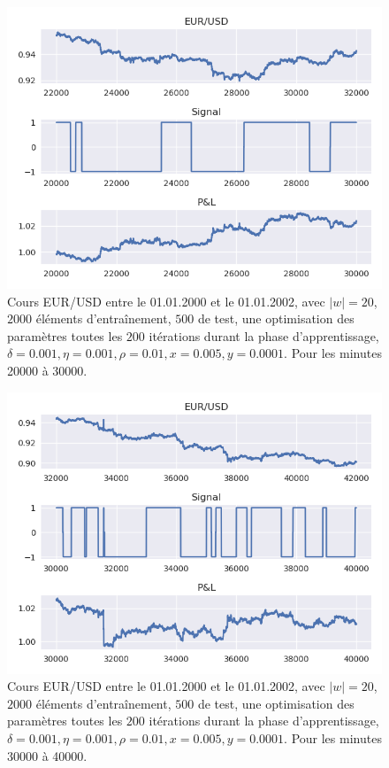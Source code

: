 \documentclass[a4paper, 11pt]{article}
\begin{document}
 \begin{figure}[H]
	\centering
	\includegraphics[scale=0.85]{images/res/eursud_2000-2001_from_20000to_30000}
	\caption[Blup]{Cours EUR/USD entre le 01.01.2000 et le 01.01.2002, avec $|w| = 20$, $2000$ éléments d'entraînement, $500$ de test, une optimisation des
		paramètres toutes les $200$ itérations durant la phase d'apprentissage, $\delta = 0.001, \eta=0.001,\rho=0.01, x = 0.005, y=0.0001$. Pour les minutes 20000 à 30000.}
\end{figure}

 \begin{figure}[H]
	\centering
	\includegraphics[scale=0.85]{images/res/eursud_2000-2001_from_30000to_40000}
	\caption[Blup]{Cours EUR/USD entre le 01.01.2000 et le 01.01.2002, avec $|w| = 20$, $2000$ éléments d'entraînement, $500$ de test, une optimisation des
		paramètres toutes les $200$ itérations durant la phase d'apprentissage, $\delta = 0.001, \eta=0.001,\rho=0.01, x = 0.005, y=0.0001$. Pour les minutes 30000 à 40000.}
\end{figure}
\end{document}
